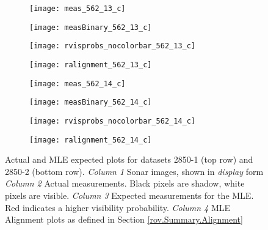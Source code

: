 \begin{figure} [h!]
	\centering
	\begin{subfigure}[b]{0.24\textwidth}
                \texttt{[image: meas\_562\_13\_c]}
                \caption{}
	\end{subfigure}
  	\centering
	\begin{subfigure}[b]{0.24\textwidth}
                \texttt{[image: measBinary\_562\_13\_c]}
		\caption{}
  	\end{subfigure}
  	\centering
	\begin{subfigure}[b]{0.24\textwidth}
                \texttt{[image: rvisprobs\_nocolorbar\_562\_13\_c]}
		\caption{}
  	\end{subfigure}
  	\centering
	\begin{subfigure}[b]{0.24\textwidth}
                \texttt{[image: ralignment\_562\_13\_c]}
		\caption{}
  	\end{subfigure}
  	
  	\begin{subfigure}[b]{0.24\textwidth}
                \texttt{[image: meas\_562\_14\_c]}
                \caption{}
	\end{subfigure}
  	\centering
	\begin{subfigure}[b]{0.24\textwidth}
                \texttt{[image: measBinary\_562\_14\_c]}
		\caption{}
  	\end{subfigure}
  	\centering
	\begin{subfigure}[b]{0.24\textwidth}
                \texttt{[image: rvisprobs\_nocolorbar\_562\_14\_c]}
		\caption{}
  	\end{subfigure}
  	\centering
	\begin{subfigure}[b]{0.24\textwidth}
                \texttt{[image: ralignment\_562\_14\_c]}
		\caption{}
  	\end{subfigure}
  	
  	\caption{Actual and MLE expected plots for datasets 2850-1 (top row) and 2850-2 (bottom row). \emph{Column 1} Sonar images, shown in \emph{display} form \emph{Column 2} Actual measurements. Black pixels are shadow, white pixels are visible. \emph{Column 3} Expected measurements for the MLE. Red indicates a higher visibility probability. \emph{Column 4} MLE Alignment plots as defined in Section \ref{rov.Summary.Alignment}}
	\label{fig:2850Plots2}
\end{figure}

